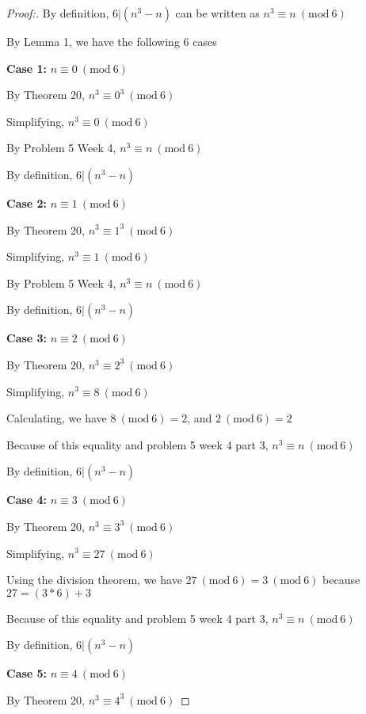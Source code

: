 \documentclass[12pt]{article}
\newcommand{\Mod}[1]{\ (\mathrm{mod}\ #1)}
\begin{document}
\begin{proof}[Proof:]
    By definition, $6 | (n^3 - n)$ can be written as $n^3 \equiv n \Mod{6}$

    By Lemma 1, we have the following 6 cases

    \medskip

    \textbf{Case 1:} $n \equiv 0 \Mod{6}$

    By Theorem 20, $n^3 \equiv 0^3 \Mod{6}$

    Simplifying, $n^3 \equiv 0 \Mod{6}$

    By Problem 5 Week 4, $n^3 \equiv n \Mod{6}$

    By definition, $6 | (n^3 - n)$

    \medskip

    \textbf{Case 2:} $n \equiv 1 \Mod{6}$

    By Theorem 20, $n^3 \equiv 1^3 \Mod{6}$

    Simplifying, $n^3 \equiv 1 \Mod{6}$

    By Problem 5 Week 4, $n^3 \equiv n \Mod{6}$

    By definition, $6 | (n^3 - n)$

    \medskip
    
    \textbf{Case 3:} $n \equiv 2 \Mod{6}$

    By Theorem 20, $n^3 \equiv 2^3 \Mod{6}$

    Simplifying, $n^3 \equiv 8 \Mod{6}$

    Calculating, we have $8 \Mod{6} = 2$, and $2 \Mod{6} = 2$

    Because of this equality and problem 5 week 4 part 3, $n^3 \equiv n \Mod{6}$

    By definition, $6 | (n^3 - n)$

    \medskip

    \textbf{Case 4:} $n \equiv 3 \Mod{6}$

    By Theorem 20, $n^3 \equiv 3^3 \Mod{6}$

    Simplifying, $n^3 \equiv 27 \Mod{6}$

    Using the division theorem, we have $27 \Mod{6} = 3 \Mod{6}$ because $27 = (3 * 6) + 3$

    Because of this equality and problem 5 week 4 part 3, $n^3 \equiv n \Mod{6}$

    By definition, $6 | (n^3 - n)$

    \medskip

    \textbf{Case 5:} $n \equiv 4 \Mod{6}$

    By Theorem 20,  $n^3 \equiv 4^3 \Mod{6}$


\end{proof}
\end{document}
